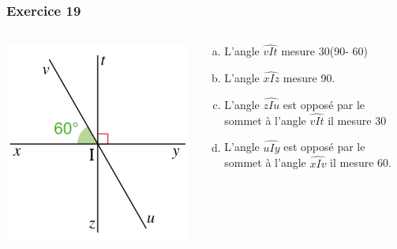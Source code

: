 \documentclass[xcolor={dvipsnames}]{beamer}
\begin{document}
\begin{frame}
	\frametitle{Exercice 19}
	
	\begin{columns}
		\begin{column}{0.4\textwidth}
			\begin{center}
				\includegraphics[scale=0.5]{19}\pause
			\end{center}
		\end{column}
		\begin{column}{0.6\textwidth}
			\begin{enumerate}[a.]
				\item L'angle  $\widehat{vIt}$ mesure 30\degree (90\degree - 60\degree) \pause
				\item L'angle  $\widehat{xIz}$ mesure 90\degree . \pause
				\item L'angle  $\widehat{zIu}$ est opposé par le sommet à l'angle $\widehat{vIt}$ il mesure 30\degree  \pause
				\item L'angle  $\widehat{uIy}$ est opposé par le sommet à l'angle $\widehat{xIv}$ il mesure 60\degree.
				
			\end{enumerate}
		\end{column}
	\end{columns}
	
	
	
\end{frame}
\end{document}

